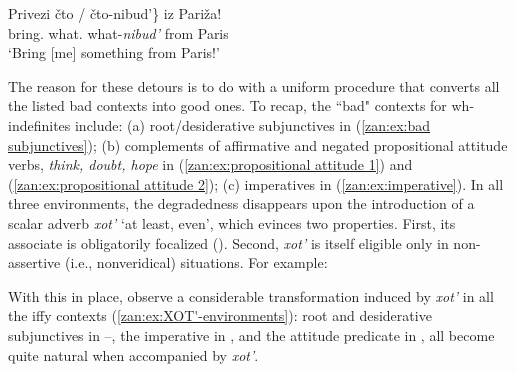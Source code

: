 \documentclass[output=paper,colorlinks,citecolor=brown]{langscibook}
\begin{document}
\ea \label{zan:ex:imperative}
        \gll  Privezi \minsp{\{*} čto / čto-nibud'\} iz Pariža! \\
       bring.{\IMP} {} what.{\INDF}  {} what-\textit{nibud'} from Paris\\
        \glt `Bring [me] something from Paris!'
\z

\noindent The reason for these detours is to do with a uniform procedure that converts all the listed bad contexts into good ones. To recap, the ``bad" contexts for wh-indefinites include: (a) root/desiderative subjunctives in (\ref{zan:ex:bad subjunctives}); (b) complements of affirmative and negated propositional attitude verbs, \textit{think, doubt, hope} in (\ref{zan:ex:propositional attitude 1}) and (\ref{zan:ex:propositional attitude 2}); (c) imperatives in (\ref{zan:ex:imperative}). In all three environments, the degradedness disappears upon the introduction of a scalar adverb \textit{xot'} `at least, even', which evinces two properties. First, its associate is obligatorily focalized (\citealt{haspelmath1997indefinite}). Second, \textit{xot'} is itself eligible only in non-assertive (i.e., nonveridical) situations. For example:

\ea
{}
\z
\z

\noindent With this in place, observe a considerable transformation induced by \textit{xot'} in all the iffy contexts (\ref{zan:ex:XOT'-environments}): root and desiderative subjunctives in --, the imperative in , and the attitude predicate in , all become quite natural when accompanied by \textit{xot'}.   
\end{document}
